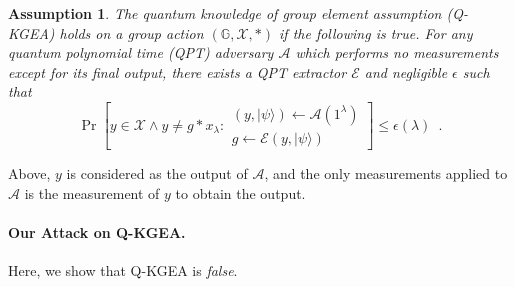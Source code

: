 \documentclass{article}\usepackage[a4paper,margin=20mm]{geometry}
\newtheorem{assumption}[theorem]{Assumption}
\numberwithin{theorem}{section}
\numberwithin{equation}{section}
\newcommand{\G}{\mathbb{G}}
\newcommand{\As}{{\mathcal{A}}}
\newcommand{\Es}{{\mathcal{E}}}
\newcommand{\Xs}{{\mathcal{X}}}
\begin{document}
\begin{assumption}\label{def:qkgea} The \emph{quantum knowledge of group element assumption} (Q-KGEA) holds on a group action $(\G,\Xs,*)$ if the following is true. For any quantum polynomial time (QPT) adversary $\As$ which performs no measurements except for its final output, there exists a QPT extractor $\Es$ and negligible $\epsilon$ such that 
	\[\Pr\left[y\in\Xs\wedge y\neq g*x_\lambda:\substack{(y,|\psi\rangle)\gets\As(1^\lambda)\\g\gets\Es(y,|\psi\rangle)}\right]\leq\epsilon(\lambda)\enspace .\]
\end{assumption}
Above, $y$ is considered as the output of $\As$, and the only measurements applied to $\As$ is the measurement of $y$ to obtain the output.

\paragraph{Our Attack on Q-KGEA.}\label{sec:KGEAattack} Here, we show that Q-KGEA is \emph{false}. 
\end{document}
